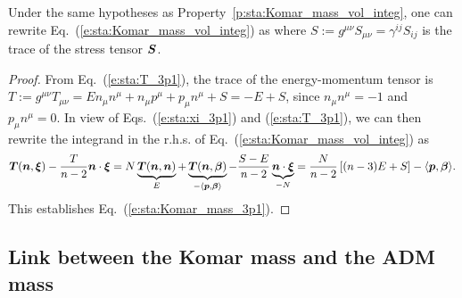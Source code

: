 \begin{prop}
Under the same hypotheses as Property~\ref{p:sta:Komar_mass_vol_integ},
one can rewrite Eq.~(\ref{e:sta:Komar_mass_vol_integ}) as
\be \label{e:sta:Komar_mass_3p1}
\ee
where $S := g^{\mu\nu} S_{\mu\nu} = \gamma^{ij} S_{ij}$
is the trace of the stress tensor $\bm{S}$.
\end{prop}
\begin{proof}
From Eq.~(\ref{e:sta:T_3p1}), the trace of the energy-momentum tensor
is $T := g^{\mu\nu} T_{\mu\nu} = E n_\mu n^\mu + n_\mu p^\mu + p_\mu n^\mu + S = - E + S$,
since $n_\mu n^\mu = - 1$ and $p_\mu n^\mu = 0$.
In view of Eqs.~(\ref{e:sta:xi_3p1}) and (\ref{e:sta:T_3p1}), we can then rewrite
the integrand in the r.h.s. of Eq.~(\ref{e:sta:Komar_mass_vol_integ}) as
\[
 \bm{T}(\bm{n}, \bm{\xi}) - \frac{T}{n-2} \bm{n}\cdot \bm{\xi} =
 N \underbrace{\bm{T}(\bm{n}, \bm{n})}_{E}
 + \underbrace{\bm{T}(\bm{n}, \bm{\beta})}_{-\langle \bm{p}, \bm{\beta} \rangle}
 - \frac{S - E}{n-2} \underbrace{\bm{n}\cdot \bm{\xi}}_{-N}
 =  \frac{N}{n-2} \left[ (n-3) E + S \right] - \langle \bm{p}, \bm{\beta} \rangle .
\]
This establishes Eq.~(\ref{e:sta:Komar_mass_3p1}).
\end{proof}



\subsection{Link between the Komar mass and the ADM mass}  \label{s:sta:Komar_ADM}

